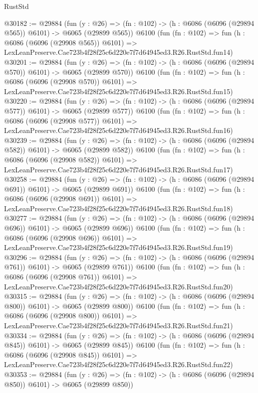 \begin{lexlean}{RustStd}
\begin{coremodule}
@30182 := @29884
    (fun (y : @26) => (fn : @102) -> (h : @6086 (@6096 (@29894 @565)) @6101) -> @6065 (@29899 @565))
    @6100
    (fun (fn : @102) =>
    fun (h : @6086 (@6096 (@29908 @565)) @6101) =>
    LexLeanPreserve.Cae723b4f28f25c6d220e7f7d64945ed3.R26.RustStd.fun14)
@30201 := @29884
    (fun (y : @26) => (fn : @102) -> (h : @6086 (@6096 (@29894 @570)) @6101) -> @6065 (@29899 @570))
    @6100
    (fun (fn : @102) =>
    fun (h : @6086 (@6096 (@29908 @570)) @6101) =>
    LexLeanPreserve.Cae723b4f28f25c6d220e7f7d64945ed3.R26.RustStd.fun15)
@30220 := @29884
    (fun (y : @26) => (fn : @102) -> (h : @6086 (@6096 (@29894 @577)) @6101) -> @6065 (@29899 @577))
    @6100
    (fun (fn : @102) =>
    fun (h : @6086 (@6096 (@29908 @577)) @6101) =>
    LexLeanPreserve.Cae723b4f28f25c6d220e7f7d64945ed3.R26.RustStd.fun16)
@30239 := @29884
    (fun (y : @26) => (fn : @102) -> (h : @6086 (@6096 (@29894 @582)) @6101) -> @6065 (@29899 @582))
    @6100
    (fun (fn : @102) =>
    fun (h : @6086 (@6096 (@29908 @582)) @6101) =>
    LexLeanPreserve.Cae723b4f28f25c6d220e7f7d64945ed3.R26.RustStd.fun17)
@30258 := @29884
    (fun (y : @26) => (fn : @102) -> (h : @6086 (@6096 (@29894 @691)) @6101) -> @6065 (@29899 @691))
    @6100
    (fun (fn : @102) =>
    fun (h : @6086 (@6096 (@29908 @691)) @6101) =>
    LexLeanPreserve.Cae723b4f28f25c6d220e7f7d64945ed3.R26.RustStd.fun18)
@30277 := @29884
    (fun (y : @26) => (fn : @102) -> (h : @6086 (@6096 (@29894 @696)) @6101) -> @6065 (@29899 @696))
    @6100
    (fun (fn : @102) =>
    fun (h : @6086 (@6096 (@29908 @696)) @6101) =>
    LexLeanPreserve.Cae723b4f28f25c6d220e7f7d64945ed3.R26.RustStd.fun19)
@30296 := @29884
    (fun (y : @26) => (fn : @102) -> (h : @6086 (@6096 (@29894 @761)) @6101) -> @6065 (@29899 @761))
    @6100
    (fun (fn : @102) =>
    fun (h : @6086 (@6096 (@29908 @761)) @6101) =>
    LexLeanPreserve.Cae723b4f28f25c6d220e7f7d64945ed3.R26.RustStd.fun20)
@30315 := @29884
    (fun (y : @26) => (fn : @102) -> (h : @6086 (@6096 (@29894 @800)) @6101) -> @6065 (@29899 @800))
    @6100
    (fun (fn : @102) =>
    fun (h : @6086 (@6096 (@29908 @800)) @6101) =>
    LexLeanPreserve.Cae723b4f28f25c6d220e7f7d64945ed3.R26.RustStd.fun21)
@30334 := @29884
    (fun (y : @26) => (fn : @102) -> (h : @6086 (@6096 (@29894 @845)) @6101) -> @6065 (@29899 @845))
    @6100
    (fun (fn : @102) =>
    fun (h : @6086 (@6096 (@29908 @845)) @6101) =>
    LexLeanPreserve.Cae723b4f28f25c6d220e7f7d64945ed3.R26.RustStd.fun22)
@30353 := @29884
    (fun (y : @26) => (fn : @102) -> (h : @6086 (@6096 (@29894 @850)) @6101) -> @6065 (@29899 @850))

\end{coremodule}
\end{lexlean}
